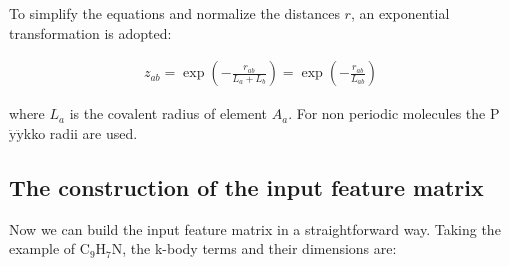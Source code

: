 \documentclass{article}
\begin{document}
\noindent To simplify the equations and normalize the distances $r$, an exponential 
transformation is adopted:

\begin{eqnarray}
z_{ab} 
= \exp{\left(-\frac{r_{ab}}{L_{a} + L_{b}}\right)}
= \exp{\left(-\frac{r_{ab}}{L_{ab}}\right)}
\end{eqnarray}

\noindent where $L_{a}$ is the covalent radius of element $A_{a}$. For non periodic 
molecules the P$\ddot{\mathrm{y}}\ddot{\mathrm{y}}$kko radii are used.

\subsection{The construction of the input feature matrix}

Now we can build the input feature matrix in a straightforward way. Taking the example 
of $\mathrm{C}_9 \mathrm{H}_7 \mathrm{N}$, the k-body terms and their dimensions are:

\begin{center}
\end{center}
\end{document}
